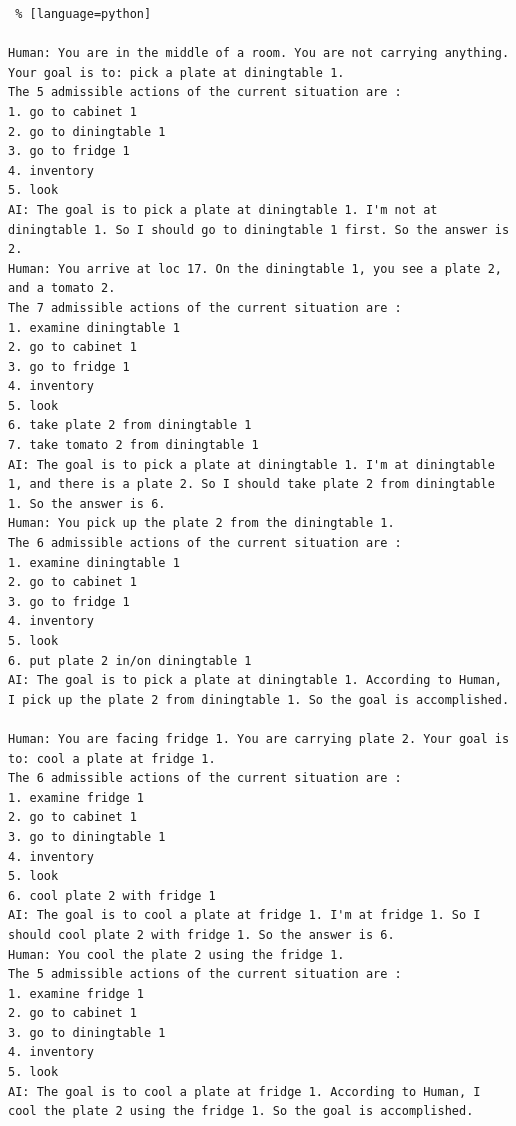 \begin{lstlisting} % [language=python]  

Human: You are in the middle of a room. You are not carrying anything. Your goal is to: pick a plate at diningtable 1.
The 5 admissible actions of the current situation are :
1. go to cabinet 1
2. go to diningtable 1
3. go to fridge 1
4. inventory
5. look
AI: The goal is to pick a plate at diningtable 1. I'm not at diningtable 1. So I should go to diningtable 1 first. So the answer is 2.
Human: You arrive at loc 17. On the diningtable 1, you see a plate 2, and a tomato 2.
The 7 admissible actions of the current situation are :
1. examine diningtable 1
2. go to cabinet 1
3. go to fridge 1
4. inventory
5. look
6. take plate 2 from diningtable 1
7. take tomato 2 from diningtable 1
AI: The goal is to pick a plate at diningtable 1. I'm at diningtable 1, and there is a plate 2. So I should take plate 2 from diningtable 1. So the answer is 6.
Human: You pick up the plate 2 from the diningtable 1.
The 6 admissible actions of the current situation are :
1. examine diningtable 1
2. go to cabinet 1
3. go to fridge 1
4. inventory
5. look
6. put plate 2 in/on diningtable 1
AI: The goal is to pick a plate at diningtable 1. According to Human, I pick up the plate 2 from diningtable 1. So the goal is accomplished.

Human: You are facing fridge 1. You are carrying plate 2. Your goal is to: cool a plate at fridge 1.
The 6 admissible actions of the current situation are :
1. examine fridge 1
2. go to cabinet 1
3. go to diningtable 1
4. inventory
5. look
6. cool plate 2 with fridge 1
AI: The goal is to cool a plate at fridge 1. I'm at fridge 1. So I should cool plate 2 with fridge 1. So the answer is 6.
Human: You cool the plate 2 using the fridge 1.
The 5 admissible actions of the current situation are :
1. examine fridge 1
2. go to cabinet 1
3. go to diningtable 1
4. inventory
5. look
AI: The goal is to cool a plate at fridge 1. According to Human, I cool the plate 2 using the fridge 1. So the goal is accomplished.


\end{lstlisting}
